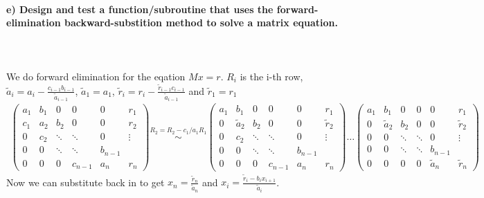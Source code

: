 \newpage
\paragraph{
    e) Design and test a function/subroutine that uses the
    forward-elimination backward-substition method to solve a matrix
    equation.
} \ \\
    \\
    We do forward elimination for the eqation $Mx = r$.  $R_i$ is the i-th row, 
    $\tilde{a}_i = a_i - \frac{c_{i-1} b_{i-1}}{\tilde{a}_{i-1}}$, 
    $\tilde{a}_1 = a_1$, 
    $\tilde{r}_i = r_i - \frac{\tilde{r}_{i-1} c_{i-1}}{\tilde{a}_{i-1}}$ and 
    $\tilde{r}_1 = r_1$
    \begin{align}
	\begin{pmatrix}
	a_1 & b_1 & 0      & 0       & 0   & r_1\\
	c_1 & a_2 & b_2    & 0       & 0 & r_2\\
	0   & c_2 & \ddots & \ddots  & 0 & \vdots\\
	0   & 0   & \ddots & \ddots  & b_{n-1} &\\
	0   & 0   & 0      & c_{n-1} & a_n& r_n
	\end{pmatrix}
	\overset{R_2 = R_2 - c_1/a_1 R_1}{\sim}
	\begin{pmatrix}
	a_1 & b_1 & 0      & 0       & 0   & r_1\\
	0 & \tilde{a}_2 & b_2    & 0       & 0 & \tilde{r}_2\\
	0   & c_2 & \ddots & \ddots  & 0 & \vdots\\
	0   & 0   & \ddots & \ddots  & b_{n-1} &\\
	0   & 0   & 0      & c_{n-1} & a_n& r_n
	\end{pmatrix}
	\dots
	\begin{pmatrix}
	a_1 & b_1 & 0      & 0       & 0   & r_1\\
	0 & \tilde{a}_2 & b_2    & 0       & 0 & \tilde{r}_2\\
	0   & 0 & \ddots & \ddots  & 0 & \vdots\\
	0   & 0   & \ddots & \ddots  & b_{n-1} &\\
	0   & 0   & 0      & 0 & \tilde{a}_n& \tilde{r}_n
	\end{pmatrix}
    \end{align}
    Now we can substitute back in to get 
    $x_n = \frac{\tilde{r}_n}{\tilde{a}_n} $ and 
    $x_i = \frac{\tilde{r}_{i} - b_{i} x_{i+1}}{\tilde{a}_{i}}$.

